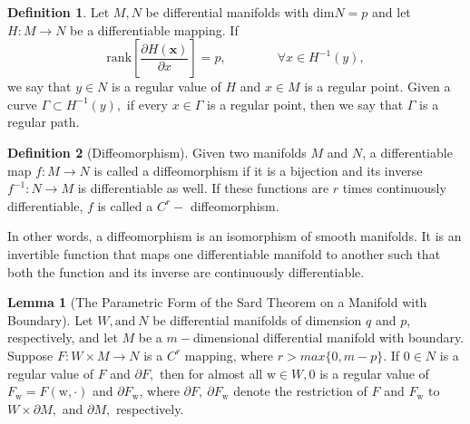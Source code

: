 \documentclass[11pt,pdflatex,sn-mathphys-ay]{sn-jnl}%
\theoremstyle{definition}
\theoremstyle{thmstyleone}%
\theoremstyle{thmstyletwo}%
\newtheorem{lemma}{Lemma}%
\theoremstyle{thmstylethree}%
\newtheorem{definition}{Definition}%
\begin{document}
	\begin{definition} 
		\label{def: regularvalue}\cite{LeeSmoothManifolds2013}
		Let $M, N$ be differential manifolds with $\text{dim} N=p$ and let
		$H : M \rightarrow N$ be a differentiable mapping. If 
		$$\text{rank} \left[\frac{\partial H(\bm{x})}{\partial x}\right]=p,\qquad\qquad\forall x\in H^{-1}(y),$$
		we say that $y\in N$ is a regular value of $H$ and $x\in M$ is a
		regular point. Given a curve $\Gamma\subset H^{-1}(y),$ if every
		$x\in \Gamma$ is a regular point, then we say that $\Gamma$ is a
		regular path.
	\end{definition}
	\begin{definition}[Diffeomorphism] \label{def_diffeomo}\cite{LeeSmoothManifolds2013}
		Given two manifolds $M$ and $N$, a differentiable map $ {\displaystyle f\colon M\rightarrow N}$ is called a diffeomorphism if it is a bijection and its inverse ${\displaystyle f^{-1}\colon N\rightarrow M}$ is differentiable as well. If these functions are  $r$ times continuously differentiable, $f$ is called a $C^{r}-$ diffeomorphism.
	\end{definition}
	In other words, a diffeomorphism is an isomorphism of smooth manifolds. It is an invertible function that maps one differentiable manifold to another such that both the function and its inverse are continuously differentiable.
	\begin{lemma}[The Parametric Form
		of the Sard Theorem on a Manifold with Boundary]\label{Sard}\cite{sard1942measure,LeeSmoothManifolds2013} Let
		$ W, \text{and}~ N$ be differential manifolds of dimension $q$
		and $p$, respectively, and let $M$ be a $m-$dimensional differential
		manifold with boundary. Suppose   $F :  W\times M\rightarrow N$
		is a $C^r$ mapping, where $r> max \{0, m-p\}.$ If $ 0\in N$ is a
		regular value of $F$ and $\partial F,$ then for almost all
		$\text{w}\in  W, 0$ is a regular value of
		$F_{\text{w}}=F(\text{w}, \cdot)$ and $\partial{F_{\text{w}}}$, where
		$\partial F, ~\partial{F_{\text{w}}}$ denote the restriction of $F$
		and $F_{\text{w}}$ to $ W\times\partial M,$ and $
		\partial M,$ respectively.
	\end{lemma}
	
\end{document}
